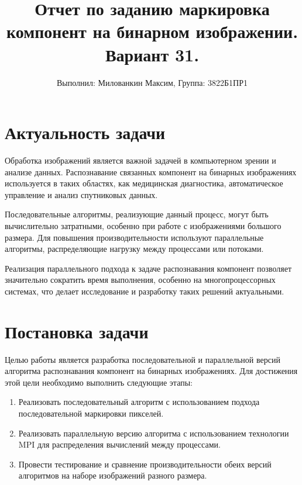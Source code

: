 \documentclass[a4paper,12pt]{article}
\title{Отчет по заданию маркировка компонент на бинарном изображении. Вариант 31.}
\author{Выполнил: Милованкин Максим, 
Группа: 3822Б1ПР1}
\begin{document}
\maketitle

\newpage
\section*{Актуальность задачи}
Обработка изображений является важной задачей в компьютерном зрении и анализе данных. Распознавание связанных компонент на бинарных изображениях используется в таких областях, как медицинская диагностика, автоматическое управление и анализ спутниковых данных.

Последовательные алгоритмы, реализующие данный процесс, могут быть вычислительно затратными, особенно при работе с изображениями большого размера. Для повышения производительности используют параллельные алгоритмы, распределяющие нагрузку между процессами или потоками.

Реализация параллельного подхода к задаче распознавания компонент позволяет значительно сократить время выполнения, особенно на многопроцессорных системах, что делает исследование и разработку таких решений актуальными.

\newpage
\section*{Постановка задачи}
Целью работы является разработка последовательной и параллельной версий алгоритма распознавания компонент на бинарных изображениях. Для достижения этой цели необходимо выполнить следующие этапы:
\begin{enumerate}
\item Реализовать последовательный алгоритм с использованием подхода последовательной маркировки пикселей.
\item Реализовать параллельную версию алгоритма с использованием технологии MPI для распределения вычислений между процессами.
\item Провести тестирование и сравнение производительности обеих версий алгоритмов на наборе изображений разного размера.
\end{enumerate}
\end{document}
